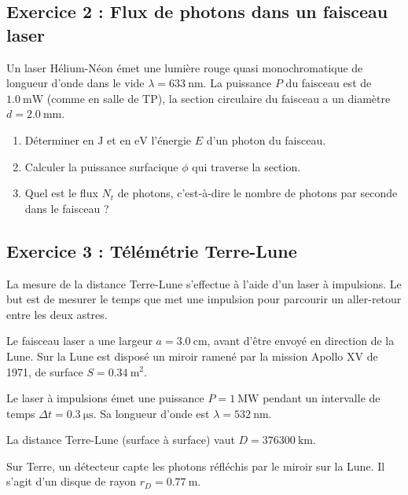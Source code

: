 \subsection{Exercice 2 : Flux de photons dans un faisceau laser}

Un laser Hélium-Néon émet une lumière rouge quasi monochromatique de longueur d'onde dans le vide $\lambda = \SI{633}{\nano\meter}$. La puissance $P$ du faisceau est de $\SI{1.0}{\milli\watt}$ (comme en salle de TP), la section circulaire du faisceau a un diamètre $d = \SI{2.0}{\milli\meter}$.

\begin{enumerate}
	\item Déterminer en $\unit{\joule}$ et en $\unit{\electronvolt}$ l'énergie $E$ d'un photon du faisceau.
	\item Calculer la puissance surfacique $\phi$ qui traverse la section.
	\item Quel est le flux $N_t$ de photons, c'est-à-dire le nombre de photons par seconde dans le faisceau ?
\end{enumerate}

\subsection{Exercice 3 : Télémétrie Terre-Lune}

La mesure de la distance Terre-Lune s'effectue à l'aide d'un laser à impulsions. Le but est de mesurer le temps que met une impulsion pour parcourir un aller-retour entre les deux astres.

Le faisceau laser a une largeur $a = \SI{3.0}{\centi\meter}$, avant d'être envoyé en direction de la Lune. Sur la Lune est disposé un miroir ramené par la mission Apollo XV de 1971, de surface $S = \SI{0.34}{\meter\squared}$.

Le laser à impulsions émet une puissance $P = \SI{1}{\mega\watt}$ pendant un intervalle de temps $\Delta t = \SI{0.3}{\micro\second}$. Sa longueur d'onde est $\lambda = \SI{532}{\nano\meter}$. 

La distance Terre-Lune (surface à surface) vaut $D = \SI{376300}{\kilo\meter}$.

Sur Terre, un détecteur capte les photons réfléchis par le miroir sur la Lune. Il s'agit d'un disque de rayon $r_D = \SI{0.77}{\meter}$.


